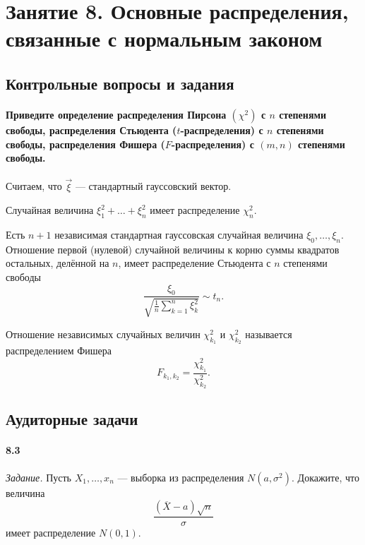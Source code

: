 \chapter*{Занятие 8. Основные распределения, связанные с нормальным законом}

\section*{Контрольные вопросы и задания}

\subsubsection*{Приведите определение распределения Пирсона $ \left( \chi^2 \right) $ с $n$
                степенями свободы, распределения Стьюдента ($t$-распределения)
                с $n$ степенями свободы, распределения Фишера ($F$-распределения)
                с $ \left(m, n \right) $ степенями свободы.}

Считаем, что $ \vec{ \xi }$ --- стандартный гауссовский вектор.

Случайная величина $ \xi_1^2 + \dotsc + \xi_n^2$ имеет распределение $ \chi_n^2$.

Есть $n + 1$ независимая стандартная гауссовская случайная величина $ \xi_0, \dotsc, \xi_n$.
Отношение первой (нулевой) случайной величины к корню суммы квадратов остальных, делённой на $n$,
имеет распределение Стьюдента с $n$ степенями свободы
$$ \frac{ \xi_0}{ \sqrt{ \frac{1}{n} \sum \limits_{k = 1}^n \xi_k^2}} \sim
  t_n.$$

Отношение независимых случайных величин $ \chi_{k_1}^2$ и $ \chi_{k_2}^2$
называется распределением Фишера
$$F_{k_1, k_2} =
  \frac{ \chi_{k_1}^2}{ \chi_{k_2}^2}.$$

\section*{Аудиторные задачи}

\subsubsection*{8.3}

\textit{Задание.}
Пусть $X_1, \dotsc, x_n$ --- выборка из распределения $N \left( a, \sigma^2 \right) $.
Докажите, что величина
$$ \frac{ \left( \overline{X} - a \right) \sqrt{n}}{ \sigma }$$
имеет распределение $N \left( 0, 1 \right) $.

